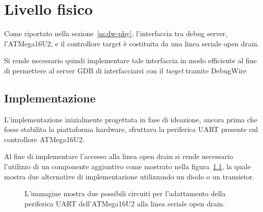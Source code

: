 \chapter{Livello fisico}

Come riportato nella sezione~\ref{ss:dw-phy}, l'interfaccia tra debug server, l'ATMega16U2, e il controllore target è costituita da una linea seriale open drain.

Si rende necessario quindi implementare tale interfaccia in modo efficiente al fine di permettere al server GDB di interfacciarsi con il \textit{target} tramite DebugWire

\section{Implementazione}

L'implementazione inizialmente progettata in fase di ideazione, ancora prima che fosse stabilita la piattaforma hardware, sfruttava la periferica UART presente sul controllore ATMega16U2\cite[chap. 18]{avr:m16u2}.

Al fine di implementare l'accesso alla linea open drain si rende necessario l'utilizzo di un componente aggiuntivo come mostrato nella figura~\ref{fig:od-impl}, la quale mostra due alternative di implementazione utilizzando un diodo o un transistor. 

\begin{figure}[t]
    \centering

    \caption[]{L'immagine mostra due possibili circuiti per l'adattamento della periferica UART dell'ATMega16U2 alla linea seriale open drain.}\label{fig:od-impl}
\end{figure}

